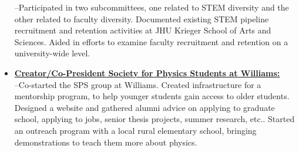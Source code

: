 \begin{itemize}
{--Participated in two subcommittees, one related to STEM diversity and the other related to faculty diversity. Documented existing STEM pipeline recruitment and retention activities at JHU Krieger School of Arts and Sciences. Aided in efforts to examine faculty recruitment and retention on a university-wide level. }
\item{\href{http://sites.williams.edu/sps/}{\textbf{Creator/Co-President Society for Physics Students at Williams:}}\\ 
--Co-started the SPS group at Williams. Created infrastructure for a mentorship program, to help younger students gain access to older students. Designed a website and gathered alumni advice on applying to graduate school, applying to jobs, senior thesis projects, summer research, etc.. Started an outreach program with a local rural elementary school, bringing demonstrations to teach them more about physics.}
\end{itemize}
 
 
